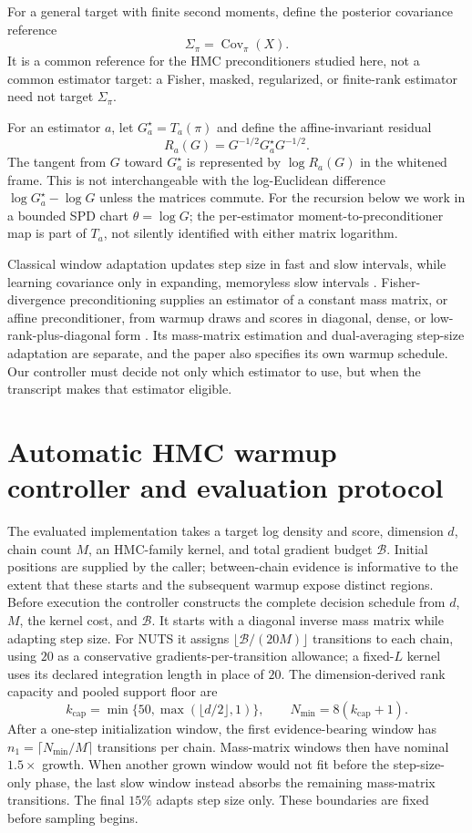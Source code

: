 \documentclass[11pt]{article}
\theoremstyle{plain}
\theoremstyle{definition}
\theoremstyle{remark}
\begin{document}
For a general target with finite second moments, define the posterior
covariance reference
\[
  \Sigma_\pi=\operatorname{Cov}_\pi(X).
\]
It is a common reference for the HMC preconditioners studied here, not a common
estimator target: a Fisher, masked, regularized, or finite-rank estimator need
not target $\Sigma_\pi$.

For an estimator $a$, let $G_a^\star=T_a(\pi)$ and define the affine-invariant
residual
\[
  R_a(G)=G^{-1/2}G_a^\star G^{-1/2}.
\]
The tangent from $G$ toward $G_a^\star$ is represented by
$\log R_a(G)$ in the whitened frame. This is not interchangeable with the
log-Euclidean difference $\log G_a^\star-\log G$ unless the matrices commute.
For the recursion below we work in a bounded SPD chart $\theta=\log G$; the
per-estimator moment-to-preconditioner map is part of $T_a$, not silently
identified with either matrix logarithm.

Classical window adaptation updates step size in fast and slow intervals, while
learning covariance only in expanding, memoryless slow intervals
\citep{carpenter2017stan,cmdstan239warmup}. Fisher-divergence
preconditioning supplies an estimator of a constant mass matrix, or affine
preconditioner, from warmup draws and scores in diagonal, dense, or
low-rank-plus-diagonal form \citep{seyboldt2026preconditioning}. Its
mass-matrix estimation and dual-averaging step-size adaptation are separate,
and the paper also specifies its own warmup schedule. Our controller must
decide not only which estimator to use, but when the transcript makes that
estimator eligible.

\section{Automatic HMC warmup controller and evaluation protocol}\label{sec:controller}

The evaluated implementation takes a target log density and score, dimension
$d$, chain count $M$, an HMC-family kernel, and total gradient budget
$\mathcal B$. Initial positions are supplied by the caller; between-chain
evidence is informative to the extent that these starts and the subsequent
warmup expose distinct regions. Before execution the controller constructs the
complete decision schedule from $d$, $M$, the kernel cost, and $\mathcal B$. It
starts with a diagonal inverse mass matrix while adapting step size. For NUTS it assigns
$\lfloor\mathcal B/(20M)\rfloor$ transitions to each chain, using $20$ as a
conservative gradients-per-transition allowance; a fixed-$L$ kernel uses its
declared integration length in place of $20$. The dimension-derived rank
capacity and pooled support floor are
\[
 k_{\mathrm{cap}}=\min\{50,\max(\lfloor d/2\rfloor,1)\},
 \qquad N_{\min}=8(k_{\mathrm{cap}}+1).
\]
After a one-step initialization window, the first evidence-bearing window has
$n_1=\lceil N_{\min}/M\rceil$ transitions per chain. Mass-matrix windows then have
nominal $1.5\times$ growth. When another grown window would not fit before the
step-size-only phase, the last slow window instead absorbs the remaining mass-matrix
transitions. The final $15\%$ adapts step size only. These boundaries are fixed
before sampling begins.
\end{document}
